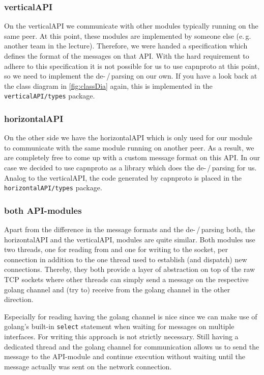 \documentclass[a4paper,english,10pt,NET]{tumarticle}
\renewcommand{\eg}{\mbox{e.\,g.}\xspace} %
\begin{document}
\subsubsection{verticalAPI}
On the verticalAPI we communicate with other modules typically running on the same peer.
At this point, these modules are implemented by someone else (\eg another team in the lecture).
Therefore, we were handed a specification which defines the format of the messages on that API.
With the hard requirement to adhere to this specification it is not possible for us to use capnproto at this point, so we need to implement the de-\,/\,parsing on our own.
If you have a look back at the class diagram in \cref{fig:classDia} again, this is implemented in the \texttt{verticalAPI/types} package.

\subsubsection{horizontalAPI}
On the other side we have the horizontalAPI which is only used for our module to communicate with the same module running on another peer.
As a result, we are completely free to come up with a custom message format on this API.
In our case we decided to use capnproto as a library which does the de-\,/\,parsing for us.
Analog to the verticalAPI, the code generated by capnproto is placed in the \texttt{horizontalAPI/types} package.

\subsubsection{both API-modules}
Apart from the difference in the message formats and the de-\,/\,parsing both, the horizontalAPI and the verticalAPI, modules are quite similar.
Both modules use two threads, one for reading from and one for writing to the socket, per connection in addition to the one thread used to establish (and dispatch) new connections.
Thereby, they both provide a layer of abstraction on top of the raw TCP sockets where other threads can simply send a message on the respective golang channel and (try to) receive from the golang channel in the other direction.

Especially for reading having the golang channel is nice since we can make use of golang's built-in \texttt{select} statement when waiting for messages on multiple interfaces.
For writing this approach is not strictly necessary.
Still having a dedicated thread and the golang channel for communication allows us to send the message to the API-module and continue execution without waiting until the message actually was sent on the network connection.
\end{document}
